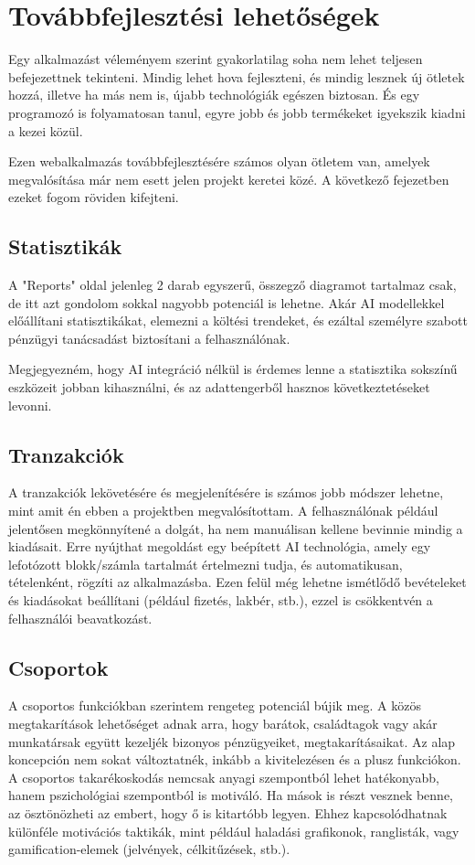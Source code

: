 \chapter{Továbbfejlesztési lehetőségek}
\label{ch:future}

Egy alkalmazást véleményem szerint gyakorlatilag soha nem lehet teljesen befejezettnek tekinteni. Mindig lehet hova fejleszteni, és mindig lesznek új ötletek hozzá, illetve ha más nem is, újabb technológiák egészen biztosan. És egy programozó is folyamatosan tanul, egyre jobb és jobb termékeket igyekszik kiadni a kezei közül.

Ezen webalkalmazás továbbfejlesztésére számos olyan ötletem van, amelyek megvalósítása már nem esett jelen projekt keretei közé. A következő fejezetben ezeket fogom röviden kifejteni.

\section{Statisztikák}
A "Reports" oldal jelenleg 2 darab egyszerű, összegző diagramot tartalmaz csak, de itt azt gondolom sokkal nagyobb potenciál is lehetne. Akár AI modellekkel előállítani statisztikákat, elemezni a költési trendeket, és ezáltal személyre szabott pénzügyi tanácsadást biztosítani a felhasználónak.

Megjegyezném, hogy AI integráció nélkül is érdemes lenne a statisztika sokszínű eszközeit jobban kihasználni, és az adattengerből hasznos következtetéseket levonni.
\section{Tranzakciók}
A tranzakciók lekövetésére és megjelenítésére is számos jobb módszer lehetne, mint amit én ebben a projektben megvalósítottam. A felhasználónak például jelentősen megkönnyítené a dolgát, ha nem manuálisan kellene bevinnie mindig a kiadásait. Erre nyújthat megoldást egy beépített AI technológia, amely egy lefotózott blokk/számla tartalmát értelmezni tudja, és automatikusan, tételenként, rögzíti az alkalmazásba. Ezen felül még lehetne ismétlődő bevételeket és kiadásokat beállítani (például fizetés, lakbér, stb.), ezzel is csökkentvén a felhasználói beavatkozást.
\section{Csoportok}

A csoportos funkciókban szerintem rengeteg potenciál bújik meg. A közös megtakarítások lehetőséget adnak arra, hogy barátok, családtagok vagy akár munkatársak együtt kezeljék bizonyos pénzügyeiket, megtakarításaikat. Az alap koncepción nem sokat változtatnék, inkább a kivitelezésen és a plusz funkciókon. A csoportos takarékoskodás nemcsak anyagi szempontból lehet hatékonyabb, hanem pszichológiai szempontból is motiváló. Ha mások is részt vesznek benne, az ösztönözheti az embert, hogy ő is kitartóbb legyen. Ehhez kapcsolódhatnak különféle motivációs taktikák, mint például haladási grafikonok, ranglisták, vagy gamification-elemek (jelvények, célkitűzések, stb.).


